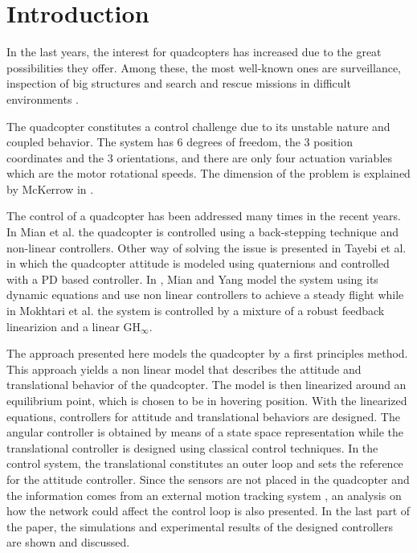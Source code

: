 \section{Introduction}
In the last years, the interest for quadcopters has increased due to the great possibilities they offer. Among these, the most well-known ones are surveillance, inspection of big structures and search and rescue missions in difficult environments \cite{droneuses}.

The quadcopter constitutes a control challenge due to its unstable nature and coupled behavior. The system has 6 degrees of freedom, the 3 position coordinates and the 3 orientations, and there are only four actuation variables which are the motor rotational speeds. The dimension of the problem is explained by McKerrow in \cite{draganflyer}.

The control of a quadcopter has been addressed many times in the recent years. In Mian et al. \cite{backstepping} the quadcopter is controlled using a back-stepping technique and non-linear controllers. Other way of solving the issue is presented in Tayebi et al. \cite{quaternionsPD} in which the quadcopter attitude is modeled using quaternions and controlled with a PD based controller. In \cite{MianWang}, Mian and Yang model the system using its dynamic equations and use non linear controllers to achieve a steady flight while in Mokhtari et al. \cite{GHinf} the system is controlled by a mixture of a robust feedback linearizion and a linear GH$_{\infty}$.

The approach presented here models the quadcopter by a first principles method. This approach yields a non linear model that describes the attitude and translational behavior of the quadcopter. The model is then linearized around an equilibrium point, which is chosen to be in hovering position. With the linearized equations, controllers for attitude and translational behaviors are designed. The angular controller is obtained by means of a state space representation while the translational controller is designed using classical control techniques. In the control system, the translational constitutes an outer loop and sets the reference for the attitude controller. Since the sensors are not placed in the quadcopter and the information comes from an external motion tracking system \cite{vicon}, an analysis on how the network could affect the control loop is also presented. In the last part of the paper, the simulations and experimental results of the designed controllers are shown and discussed.